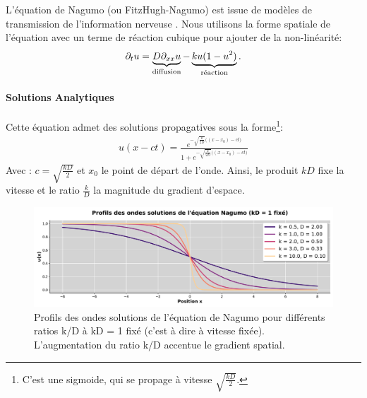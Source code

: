 L'équation de Nagumo (ou FitzHugh-Nagumo) est issue de modèles de transmission de l'information nerveuse \cite{FITZHUGH1961445}.
Nous utilisons la forme spatiale de l'équation \cite{keener1998mathematical} avec un terme de réaction cubique pour ajouter de la non-linéarité:
\begin{align}
    \partial_t u = \underbrace{D \partial_{xx} u}_{\text{diffusion}}
            - \underbrace{ku(1-u^2)}_{\text{réaction}}.
\end{align}
\paragraph{Solutions Analytiques}
Cette équation admet des solutions propagatives sous la forme\footnote{C'est une sigmoide, qui se propage à vitesse $\sqrt{\frac{kD}{2}}$.}:%
\begin{align}
    \label{eq:sol_nagumo}
 u(x-ct) = \frac{e^{
 -\sqrt{\frac{k}{2D}} \bigl((x-x_0) - ct \bigr)}
 }
 {1 + e^{
 -\sqrt{\frac{k}{2D}} \bigl((x-x_0) - ct \bigr)}
 }
\end{align}
Avec : $c = \sqrt{\frac{kD}{2}}$ et $x_0$ le point de départ de l'onde.
Ainsi, le produit $kD$ fixe la vitesse et le ratio $\frac{k}{D}$ la magnitude du gradient d'espace.

\begin{figure}[htbp]
    \centering
    \includegraphics[width=\textwidth]{media/4_travail/2_nagumo/profils_nagumo.pdf}
    \caption{Profils des ondes solutions de l'équation de Nagumo pour différents ratios k/D à kD = 1 fixé (c'est à dire à vitesse fixée). L'augmentation du ratio k/D accentue le gradient spatial.}
    \label{fig:profils_nagumo}
\end{figure}

